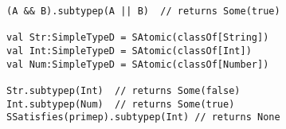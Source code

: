 \begin{lstlisting}[style=scalaioScala]
(A && B).subtypep(A || B)  // returns Some(true)
  
val Str:SimpleTypeD = SAtomic(classOf[String])
val Int:SimpleTypeD = SAtomic(classOf[Int])
val Num:SimpleTypeD = SAtomic(classOf[Number])

Str.subtypep(Int)  // returns Some(false)
Int.subtypep(Num)  // returns Some(true)
SSatisfies(primep).subtypep(Int) // returns None
\end{lstlisting}
